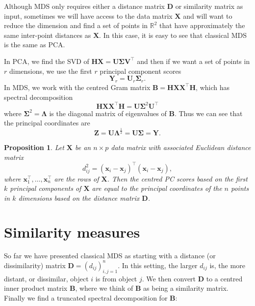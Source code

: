 \documentclass[]{book}
\newtheorem{proposition}{Proposition}[chapter]
\theoremstyle{definition}
\theoremstyle{definition}
\theoremstyle{definition}
\theoremstyle{remark}
\begin{document}
Although MDS only requires either a distance matrix \(\mathbf D\) or similarity matrix as input, sometimes we will have access to the data matrix \(\mathbf X\) and will want to reduce the dimension and
find a set of points in \(\mathbb{R}^2\) that have approximately the same inter-point distances as \(\mathbf X\). In this case, it is easy to see that classical MDS is the same as PCA.

In PCA, we find the SVD of \(\mathbf H\mathbf X= \mathbf U\boldsymbol{\Sigma}\mathbf V^\top\) and then if we want a set of points in \(r\) dimensions, we use the first \(r\) principal component scores
\[\mathbf Y_r=\mathbf U_{r}\boldsymbol{\Sigma}_r.\]
In MDS, we work with the centred Gram matrix
\(\mathbf B=\mathbf H\mathbf X\mathbf X^\top \mathbf H\), which has spectral decomposition
\[\mathbf H\mathbf X\mathbf X^\top \mathbf H= \mathbf U\boldsymbol{\Sigma}^2 \mathbf U^\top\]
where \(\boldsymbol{\Sigma}^2 =\boldsymbol \Lambda\) is the diagonal matrix of eigenvalues of \(\mathbf B\). Thus we can see that the principal coordinates are
\[\mathbf Z= \mathbf U\boldsymbol \Lambda^\frac{1}{2} = \mathbf U\boldsymbol{\Sigma}=\mathbf Y.\]

\begin{proposition}
\protect\hypertarget{prp:mds0}{}{\label{prp:mds0} } Let \(\mathbf X\) be an \(n \times p\) data matrix with associated Euclidean distance matrix
\[
d_{ij}^2 = (\mathbf x_i -\mathbf x_j)^\top(\mathbf x_i -\mathbf x_j),
\]
where \(\mathbf x_1^\top, \ldots , \mathbf x_n^\top\) are the rows of \(\mathbf X\). Then the centred PC scores based on the first \(k\) principal components of \(\mathbf X\) are equal to the principal coordinates of the \(n\) points in \(k\) dimensions based on the distance matrix \(\mathbf D\).
\end{proposition}

\hypertarget{similarity}{%
\section{Similarity measures}\label{similarity}}

So far we have presented classical MDS as starting with a distance (or dissimilarity) matrix \(\mathbf D=(d_{ij})_{i,j=1}^n\). In this setting, the larger \(d_{ij}\) is, the more distant, or dissimilar, object \(i\) is from object \(j\).
We then convert \(\mathbf D\) to a centred inner product matrix \(\mathbf B\), where we think of \(\mathbf B\) as being a similarity matrix. Finally we find a truncated spectral decomposition for \(\mathbf B\):
\end{document}
